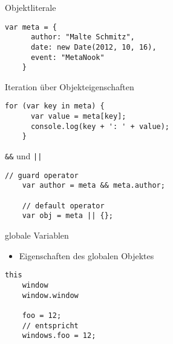 \begin{frame}[fragile]{Objektliterale}
  \begin{lstlisting}[gobble=4]
    var meta = {
      author: "Malte Schmitz",
      date: new Date(2012, 10, 16),
      event: "MetaNook"
    }
  \end{lstlisting}
\end{frame}

\begin{frame}[fragile]{Iteration über Objekteigenschaften}
  \begin{lstlisting}[gobble=4]
    for (var key in meta) {
      var value = meta[key];
      console.log(key + ': ' + value);
    }
  \end{lstlisting}
\end{frame}

\begin{frame}[fragile]{\texttt{\&\&} und \texttt{||}}
  \begin{lstlisting}[gobble=4]
    // guard operator
    var author = meta && meta.author;
    
    // default operator
    var obj = meta || {};
  \end{lstlisting}
\end{frame}


\begin{frame}[fragile]{globale Variablen}
  \begin{itemize}
    \item Eigenschaften des globalen Objektes
  \end{itemize}
  
  \begin{lstlisting}[gobble=4]
    this
    window
    window.window
  
    foo = 12;
    // entspricht
    windows.foo = 12;
  \end{lstlisting}
\end{frame}

